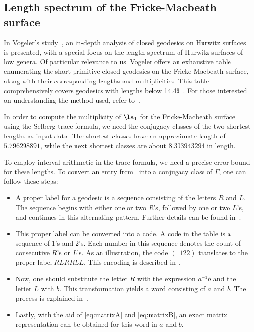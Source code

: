 \subsection{Length spectrum of the Fricke-Macbeath surface}
In Vogeler's study~\cite{Vogeler2003}, an in-depth analysis of closed geodesics on Hurwitz surfaces is presented, with a special focus on the length spectrum of Hurwitz surfaces of low genera.
Of particular relevance to us, Vogeler offers an exhaustive table~\cite[Table C.2]{Vogeler2003} enumerating the short primitive closed geodesics on the Fricke-Macbeath surface, along with their corresponding lengths and multiplicities.
This table comprehensively covers geodesics with lengths below 14.49~\cite[p. 57]{Vogeler2003}.
For those interested on understanding the method used, refer to~\cite[Section 2.3]{Vogeler2003}.

In order to compute the multiplicity of \(\la_1\) for the Fricke-Macbeath surface using the Selberg trace formula, we need the conjugacy classes of the two shortest lengths as input data.
The shortest classes have an approximate length of \(5.796298891\), while
the next shortest classes are about \(8.303943294\) in length.

To employ interval arithmetic in the trace formula, we need a precise error bound for these lengths.
To convert an entry from~\cite[Table C.2]{Vogeler2003} into a conjugacy class of $\Gamma$, one can follow these steps:
\begin{itemize}
    \item A proper label for a geodesic is a sequence consisting of the letters $R$ and $L$. The sequence begins with either one or two $R$’s, followed by one or two $L$’s, and continues in this alternating pattern. Further details can be found in~\cite[p. 19]{Vogeler2003}.
    \item This proper label can be converted into a code. A code in the table is a sequence of 1’s and 2’s. Each number in this sequence denotes the count of consecutive $R$’s or $L$’s. As an illustration, the code $(1 1 2 2)$ translates to the proper label $RLRRLL$. This encoding is described in~\cite[p. 23]{Vogeler2003}.
    \item Now, one should substitute the letter $R$ with the expression $a^{-1}b$ and the letter $L$ with $b$. This transformation yields a word consisting of $a$ and $b$. The process is explained in~\cite[p. 32]{Vogeler2003}.    
    \item Lastly, with the aid of \eqref{eq:matrixA} and \eqref{eq:matrixB}, an exact matrix representation can be obtained for this word in $a$ and $b$.    
\end{itemize}

